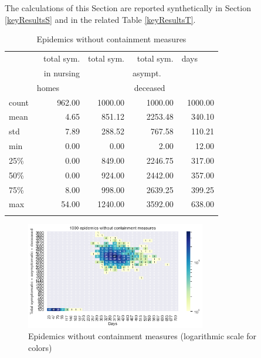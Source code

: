 \documentclass[graybox]{svmult}
\begin{document}
The calculations of this Section are reported synthetically in Section \ref{keyResultsS} and in the related Table \ref{keyResultsT}.

\begin{table}[t]
\center
\small
\begin{tabular}{lrrrr}
\hline\noalign{\smallskip}
{} & total sym.        &  total sym. & total sym.     & days~~~~ \\
{} & in nursing        &                  & asympt.~~~  & \\
{} & homes~~~~~  &                  & deceased~~ & \\
\noalign{\smallskip}\svhline\noalign{\smallskip}
count &     962.00 &             1000.00 &                 1000.00 & 1000.00 \\
mean  &       4.65 &              851.12 &                 2253.48 &  340.10 \\
std   &       7.89 &              288.52 &                  767.58 &  110.21 \\
min   &       0.00 &                0.00 &                    2.00 &   12.00 \\
25\%   &       0.00 &              849.00 &                 2246.75 &  317.00 \\
50\%   &       0.00 &              924.00 &                 2442.00 &  357.00 \\
75\%   &       8.00 &              998.00 &                 2639.25 &  399.25 \\
max   &      54.00 &             1240.00 &                 3592.00 &  638.00 \\
\hline\noalign{\smallskip}
\end{tabular}

\label{EpidemicsWithoutControlT}
\caption{Epidemics without containment measures}
\end{table}

\begin{figure}[t]
\begin{center}
\includegraphics[width=0.7\textwidth]{HM30_readRunResults1k_noControl_plusHMlog.png}
\caption{Epidemics without containment measures (logarithmic scale for colors)}
\label{EpidemicsWithoutControlHM}
\end{center}
\end{figure}
\end{document}
